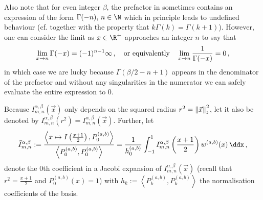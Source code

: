 Also note that for even integer $\beta$, the prefactor in  sometimes contains an expression of the form $\Gamma(-n),\, n \in \N$ which in principle leads to undefined behaviour (cf.  together with the property that $k \Gamma(k) = \Gamma(k+1)$).
However, one can consider the limit as $x \in \R^+$ approaches an integer $n$ to say that
$$\lim_{x \rightarrow n} \Gamma(-x) = (-1)^{n-1} \infty\,, \quad\text{or equivalently}\quad \lim_{x \rightarrow n} \frac{1}{\Gamma(-x)} = 0\,,$$
in which case we are lucky because $\Gamma(\beta/2-n+1)$ appears in the denominator of the prefactor and without any singularities in the numerator we can safely evaluate the entire expression to $0$.

Because $I_{m,n}^{\alpha,\beta}(\vec{x})$ only depends on the squared radius $r^2 = \left\lVert\vec{x}\right\rVert_{\scriptscriptstyle 2}^2$, let it also be denoted by $I_{m,n}^{\alpha,\beta}(r^2) = I_{m,n}^{\alpha,\beta}(\vec{x})$.
Further, let
\begin{equation}
  \bar{I}_{m,n}^{\alpha,\beta} := \frac{\left\langle x \mapsto I\left(\frac{x+1}{2}\right), P_0^{(a, b)} \right\rangle}{\left\langle P_0^{(a, b)}, P_0^{(a, b)} \right\rangle} = \frac{1}{h_0^{(a, b)}} \int_{-1}^{1} I_{m,n}^{\alpha,\beta}\left(\frac{x+1}{2}\right) w^{(a,b)}(x) \,\ddx\,,
  \label{eq:0th-coeff-of-I}
\end{equation}
denote the 0th coefficient in a Jacobi expansion of $I_{m,n}^{\alpha,\beta}(\vec{x})$ (recall that $r^2 = \frac{x+1}{2}$ and $P_0^{(a, b)}(x) = 1$) with $h_k := \left\langle P_k^{(a, b)}, P_k^{(a, b)} \right\rangle$ the normalisation coefficients of the basis.
